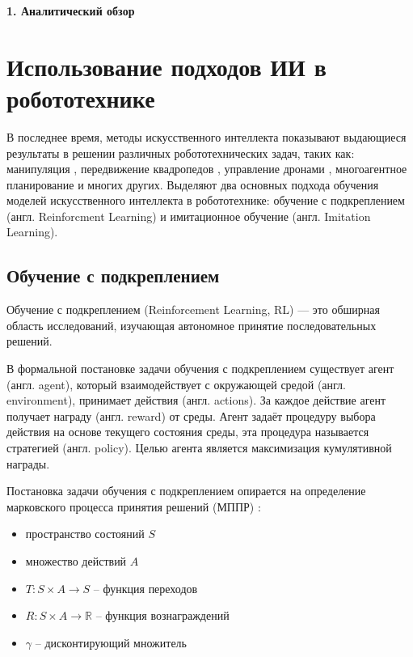 \newpage
\begin{center}
  \textbf{\large 1. Аналитический обзор }
\end{center}

\section{Использование подходов ИИ в робототехнике}

    В последнее время, методы искусственного интеллекта показывают выдающиеся результаты в решении различных робототехнических задач, таких как: манипуляция \cite{related-manipulation-1, related-manipulation-2}, передвижение квадропедов \cite{related-locomotion-1, related-locomotion-2}, управление дронами \cite{related-drone-1, related-drone-2}, многоагентное планирование \cite{related-multi-agent-1, related-multi-agent-2} и многих других. Выделяют два основных подхода обучения моделей искусственного интеллекта в робототехнике: обучение с подкреплением (англ. Reinforcment Learning) и имитационное обучение (англ. Imitation Learning). 

    \subsection{Обучение с подкреплением}

        Обучение с подкреплением (Reinforcement Learning, RL) — это обширная область исследований, изучающая автономное принятие последовательных решений.

        В формальной постановке задачи обучения с подкреплением существует агент (англ. agent), который взаимодействует с окружающей средой (англ. environment), принимает действия (англ. actions). За каждое действие агент получает награду (англ. reward) от среды. Агент задаёт процедуру выбора действия на основе текущего состояния среды, эта процедура называется стратегией (англ. policy). Целью агента является максимизация кумулятивной награды.  
        
        Постановка задачи обучения с подкреплением опирается на определение марковского процесса принятия решений (МППР) \cite{puterman2014markov}:

        \begin{itemize}
            \item пространство состояний $S$ 
            \item множество действий $A$
            \item $T: S \times A \to S$ -- функция переходов
            \item $R: S \times A \to \mathbb{R}$  -- функция вознаграждений
            \item $\gamma$ -- дисконтирующий множитель
        \end{itemize}


